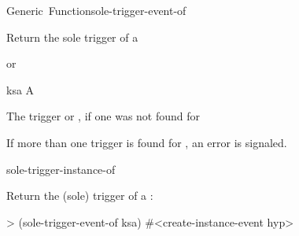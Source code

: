 \documentclass[10pt,twoside,english,pdftex]{article}
\begin{document}

\begin{functiondoc}{Generic~Function}{sole-trigger-event-of}{ 
    \returns{} }
%
%
%

\fnsyntax

\fnpurpose Return the sole trigger  of a 

\fnmethods
{}%
  {\code{(} 
  \returns{}  or \nil}

\fnpackage {}

\fnmodule {}

\fnargs
\begin{args}{ksa}
\arg[ksa] A 
\end{args}

\fnreturns The trigger  or \nil, if one was not found for
  
\fndescription If more than one trigger  is found for
, an error is signaled.

\begin{alsos}{sole-trigger-instance-of}
\end{alsos}

\fnexample
Return the (sole) trigger  of a :
\begin{example}
> (sole-trigger-event-of ksa)
#<create-instance-event hyp>
\end{example}

\end{functiondoc}

\end{document}
